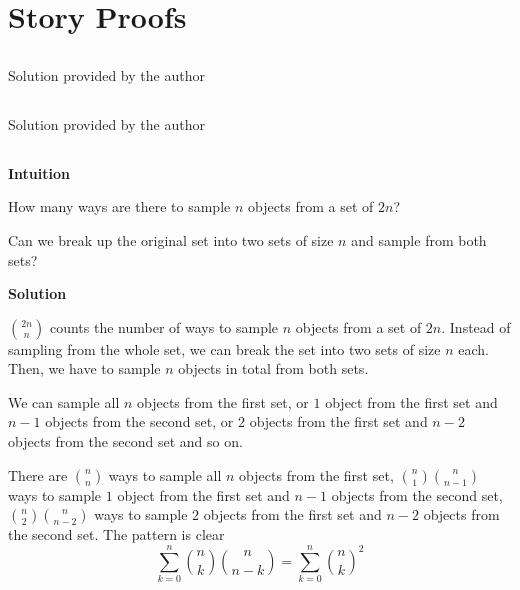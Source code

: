 \documentclass[]{book}
\begin{document}
\section{Story Proofs}\label{story-proofs}

\subsection{}\label{section-14}

Solution provided by the author

\subsection{}\label{section-15}

Solution provided by the author

\subsection{}\label{section-16}

\textbf{Intuition}

How many ways are there to sample \(n\) objects from a set of \(2n\)?

Can we break up the original set into two sets of size \(n\) and sample
from both sets?

 \textbf{Solution}

\({2n \choose n}\) counts the number of ways to sample \(n\) objects
from a set of \(2n\). Instead of sampling from the whole set, we can
break the set into two sets of size \(n\) each. Then, we have to sample
\(n\) objects in total from both sets.

We can sample all \(n\) objects from the first set, or \(1\) object from
the first set and \(n-1\) objects from the second set, or \(2\) objects
from the first set and \(n-2\) objects from the second set and so on.

There are \({n \choose n}\) ways to sample all \(n\) objects from the
first set, \({n \choose 1} {n \choose n-1}\) ways to sample \(1\) object
from the first set and \(n-1\) objects from the second set,
\({n \choose 2} {n \choose n-2}\) ways to sample \(2\) objects from the
first set and \(n-2\) objects from the second set. The pattern is clear
\[ \sum_{k=0}^{n} {n \choose k} {n \choose n-k} = \sum_{k=0}^{n} {n \choose k}^{2}\]


\end{document}
